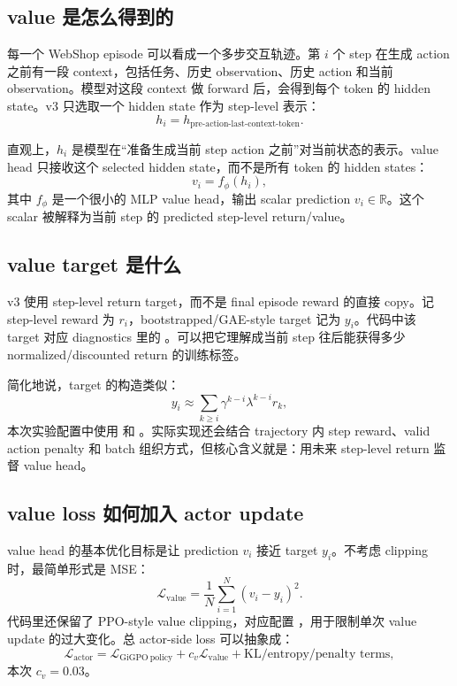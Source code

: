 \documentclass[10pt]{ctexart}
\begin{document}
\subsection{value 是怎么得到的}
每一个 WebShop episode 可以看成一个多步交互轨迹。第 $i$ 个 step 在生成 action 之前有一段 context，包括任务、历史 observation、历史 action 和当前 observation。模型对这段 context 做 forward 后，会得到每个 token 的 hidden state。v3 只选取一个 hidden state 作为 step-level 表示：
\begin{equation}
  h_i = h_{\text{pre-action-last-context-token}}.
\end{equation}

直观上，$h_i$ 是模型在“准备生成当前 step action 之前”对当前状态的表示。value head 只接收这个 selected hidden state，而不是所有 token 的 hidden states：
\begin{equation}
  v_i = f_\phi(h_i),
\end{equation}
其中 $f_\phi$ 是一个很小的 MLP value head，输出 scalar prediction $v_i \in \mathbb{R}$。这个 scalar 被解释为当前 step 的 predicted step-level return/value。

\subsection{value target 是什么}
v3 使用 step-level return target，而不是 final episode reward 的直接 copy。记 step-level reward 为 $r_i$，bootstrapped/GAE-style target 记为 $y_i$。代码中该 target 对应 diagnostics 里的 。可以把它理解成当前 step 往后能获得多少 normalized/discounted return 的训练标签。

简化地说，target 的构造类似：
\begin{equation}
  y_i \approx \sum_{k \ge i} \gamma^{k-i} \lambda^{k-i} r_k,
\end{equation}
本次实验配置中使用  和 。实际实现还会结合 trajectory 内 step reward、valid action penalty 和 batch 组织方式，但核心含义就是：用未来 step-level return 监督 value head。

\subsection{value loss 如何加入 actor update}
value head 的基本优化目标是让 prediction $v_i$ 接近 target $y_i$。不考虑 clipping 时，最简单形式是 MSE：
\begin{equation}
  \mathcal{L}_{\mathrm{value}} = \frac{1}{N}\sum_{i=1}^{N} (v_i - y_i)^2.
\end{equation}
代码里还保留了 PPO-style value clipping，对应配置 ，用于限制单次 value update 的过大变化。总 actor-side loss 可以抽象成：
\begin{equation}
  \mathcal{L}_{\mathrm{actor}} = \mathcal{L}_{\mathrm{GiGPO\ policy}} + c_v \mathcal{L}_{\mathrm{value}} + \text{KL/entropy/penalty terms},
\end{equation}
本次 $c_v=0.03$。
\end{document}
